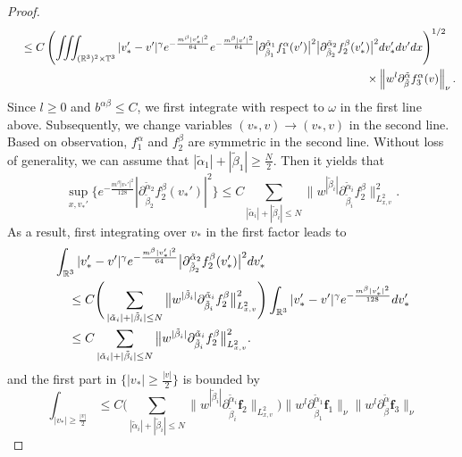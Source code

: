 \documentclass[reqno]{amsart}
\numberwithin{equation}{section}
\numberwithin{equation}{section}
\begin{document}
\begin{proof}
$$\begin{aligned}
		 	&\hspace{0.4cm}\leq C \left( \iiint_{(\mathbb{R}^3)^2\times\mathbb{T}^3} |v_*' - v'|^\gamma e^{-\frac{m^{\beta}|v_*'|^2}{64}}e^{-\frac{m^{\beta}|v'|^2}{64}} \big|\partial_{\tilde{\beta}_1}^{\tilde{\alpha}_1}f^{\alpha}_1 (v')\big|^2 \big|\partial_{\tilde{\beta}_2}^{\tilde{\alpha}_2}f^{\beta}_2(v_*')\big|^2 dv_*'dv'dx \right)^{1/2} \\
		 	 &\hspace{11.1cm}\times\left\| w^l \partial_{\tilde{\beta}}^{\tilde{\alpha}}f^{\alpha}_3 (v)\right\|_{\nu}.
		 \end{aligned}
		 $$
	Since $l\geq0$ and $b^{\alpha\beta}\leq C$, we first  integrate with respect to $\omega$  in the first line above. Subsequently, we change variables  $(v_*,v)\rightarrow(v_*,v)$ in the second line.
	Based on observation, $f^{\alpha}_1$ and $f^{\beta}_2$ are symmetric in the second line.  Without loss of generality, we can assume that $|\tilde{\alpha}_1| + |\tilde{\beta}_1| \geq \frac{N}{2}$. Then it yields that
	 $$
	\sup_{x,v_*'} \Big\{ e^{-\frac{m^{\beta}|v_*'|^2}{128}} |\partial_{\tilde{\beta}_2}^{\tilde{\alpha}_2}f^{\beta}_2(v_*')|^2 \Big\} \leq C \sum_{|\tilde{\alpha}_i| + |\tilde{\beta}_i| \le N} \big\| w^{|\tilde{\beta}_i|} \partial_{\tilde{\beta}_i}^{\tilde{\alpha}_i} f^{\beta}_2 \big\|_{L^{2}_{x,v}}^2. 
	$$
	As a result, first integrating over $v_*$ in the first factor leads to
	\begin{align*}
		&\int_{\mathbb{R}^3} |v_*' - v'|^\gamma e^{-\frac{m^{\beta}|v_*'|^2}{64}} \big|\partial_{\tilde{\beta}_2}^{\tilde{\alpha}_2}f^{\beta}_2(v_*')\big|^2 dv_*' \\
		&\hspace{0.4cm} \leq C \Bigg(\sum_{|\tilde{\alpha}_i| + |\tilde{\beta}_i| \le N} \big\| w^{|\tilde{\beta}_i|} \partial_{\tilde{\beta}_i}^{\tilde{\alpha}_i} f^{\beta}_2 \big\|_{L^{2}_{x,v}}^2\Bigg) \int_{\mathbb{R}^3} |v_*' - v'|^\gamma e^{-\frac{m^{\beta}|v_*'|^2}{128}} dv_*' \\
		&\hspace{0.4cm}\leq C \sum_{|\tilde{\alpha}_i| + |\tilde{\beta}_i| \le N} \big\| w^{|\tilde{\beta}_i|} \partial_{\tilde{\beta}_i}^{\tilde{\alpha}_i} f^{\beta}_2 \big\|_{L^{2}_{x,v}}^2.
	\end{align*}
	and the first part in $\{|v_*| \geq \frac{|v|}{2}\}$  is bounded by
	 \begin{equation*}
	\int_{|v_*| \ge \frac{|v|}{2}} \leq C \Bigg( \sum_{|\tilde{\alpha}_i| + |\tilde{\beta}_i| \le N} \big\| w^{|\tilde{\beta}_i|}  \partial_{\tilde{\beta}_i}^{\tilde{\alpha}_i}\mathbf{f}_2  \big\|_{L^{2}_{x,v}} \Bigg) \big\| w^l \partial_{\tilde{\beta}_1}^{\tilde{\alpha}_1}\mathbf{f}_1 \big\|_{\nu} \big\| w^l \partial_{\tilde{\beta}}^{\tilde{\alpha}}\mathbf{f}_3 \big\|_{\nu}
	\end{equation*}


\end{proof}
\end{document}
